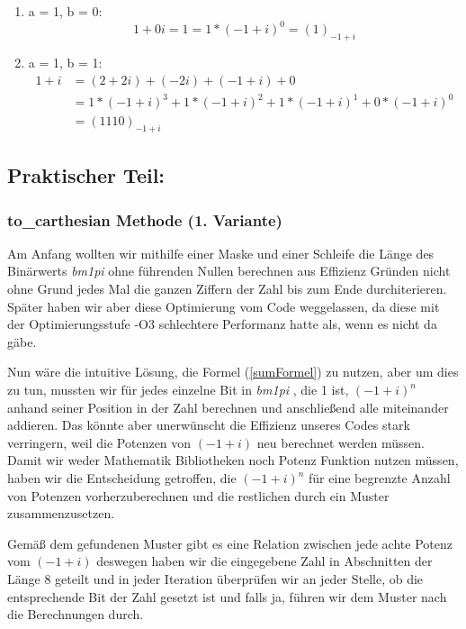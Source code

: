 \documentclass[course=erap]{aspdoc}
\begin{document}
\begin{enumerate}[label=\roman*) Falls]
        \item a = 1, b = 0:
        \[ 1 + 0i  = 1 = 1*(-1+i)^0 =  (1)_{-1+i}\]

        \item a = 1, b = 1:
        \begin{equation*}
            \begin{split}
                1 + i  &= (2+2i) + (-2i) + (-1+i) + 0 \\
                &= 1*(-1+i)^3 + 1*(-1+i)^2 + 1*(-1+i)^1 + 0*(-1+i)^0 \\
                &=  (1110)_{-1+i}
            \end{split}
        \end{equation*}

    \end{enumerate}

    \newpage

    \subsection{Praktischer Teil:}

    \subsubsection{to\_carthesian Methode (1. Variante)}
    Am Anfang wollten wir mithilfe einer Maske und einer Schleife die Länge des Binärwerts  \textit{bm1pi}  \space ohne führenden Nullen berechnen aus Effizienz Gründen nicht ohne Grund jedes Mal die ganzen Ziffern der Zahl bis zum Ende durchiterieren.
    Später haben wir aber diese Optimierung vom Code weggelassen, da diese mit der Optimierungsstufe -O3 schlechtere Performanz hatte als, wenn es nicht da gäbe.\newline

    Nun wäre die intuitive Lösung, die Formel (\ref{sumFormel}) zu nutzen, aber um dies zu tun, mussten wir für jedes einzelne Bit in  \textit{bm1pi} , die 1 ist, $(-1+i)^{n}$ anhand seiner Position in der Zahl berechnen und anschließend alle miteinander addieren.
    Das könnte aber unerwünscht die Effizienz unseres Codes stark verringern, weil die Potenzen von $(-1+i)$ neu berechnet werden müssen.
    Damit wir weder Mathematik Bibliotheken noch Potenz Funktion nutzen müssen, haben wir die Entscheidung getroffen, die $(-1+i)^{n}$ für eine begrenzte Anzahl von Potenzen vorherzuberechnen und die restlichen durch ein Muster zusammenzusetzen.

    Gemäß dem gefundenen Muster gibt es eine Relation zwischen jede achte Potenz vom $(-1+i)$ deswegen haben wir die eingegebene Zahl in Abschnitten der Länge 8 geteilt und in jeder Iteration überprüfen wir an jeder Stelle, ob die entsprechende Bit der Zahl gesetzt ist und falls ja, führen wir dem Muster nach die Berechnungen durch.
\end{document}
